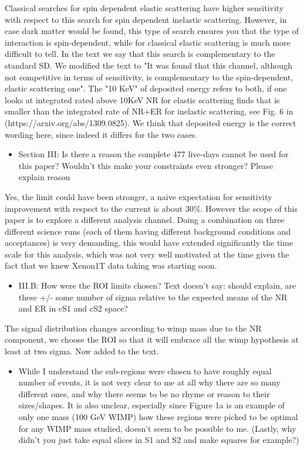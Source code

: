 \documentclass{article}
\begin{document}
Classical searches for spin dependent elastic scattering have higher sensitivity with respect to this search for spin 
dependent inelastic scattering. However, in case dark matter would be found, this type of search ensures you that the type 
of interaction is spin-dependent, while for classical elastic scattering is much more difficult to tell.
In the text we say that this search is complementary to the standard SD.  We modified the text to "It was found that this channel,  
although not competitive in terms of sensitivity,  
is complementary to the spin-dependent, elastic scattering one".
The "10 KeV" of deposited energy refers to both, if one looks at integrated rated above 10KeV NR for elastic scattering 
finds that is smaller than the integrated rate of  NR+ER for inelastic scattering, see Fig. 6 in (https://arxiv.org/abs/1309.0825).
We think that deposited energy is the correct wording here, since indeed it differs for the two cases.

\begin{itemize}
	\item {\color{blue} 
Section III: Is there a reason the complete 477 live-days cannot be
used for this paper? Wouldn’t this make your constraints even
stronger? Please explain reason}
\end{itemize}

Yes, the limit could have been stronger, a naive expectation for sensitivity improvement with respect to the current is about 30\%.
However the scope of this paper is to explore a different analysis channel.
Doing a combination on three different science runs (each of them having 
different background conditions and acceptances) is very demanding,
this would have extended significantly the time scale for this analysis,
which was not very well motivated at the time given the fact that we knew 
Xenon1T data taking was starting soon.


\begin{itemize}
	\item {\color{blue} 
III.B: How were the ROI limits chosen? Text doesn’t say: should
explain, are these +/- some number of sigma relative to the expected
means of the NR and ER in cS1 and cS2 space?}
\end{itemize}

The signal distribution changes according to wimp mass due to the NR component,
we choose the ROI so that it will embrace all the wimp hypothesis at least at two 
sigma. Now added to the text.


\begin{itemize}
	\item {\color{blue} 
While I understand the sub-regions were chosen to have roughly equal
number of events, it is not very clear to me at all why there are so
many different ones, and why there seems to be no rhyme or reason to
their sizes/shapes. It is also unclear, especially since Figure 1a is
an example of only one mass (100 GeV WIMP) how these regions were
picked to be optimal for any WIMP mass studied, doesn’t seem to be
possible to me. (Lastly, why didn’t you just take equal slices in S1
and S2 and make squares for example?)}
\end{itemize}
\end{document}
